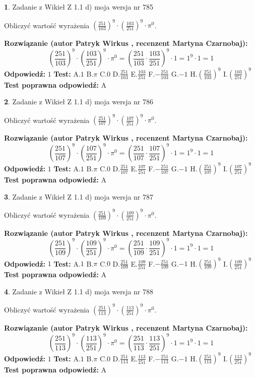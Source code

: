 \documentclass[12pt, a4paper]{article}
\theoremstyle{definition} %
\newtheorem{zad}{}
\newcommand{\zadStart}[1]{\begin{zad}#1\newline}
\newcommand{\zadStop}{\end{zad}}
\newcommand{\rozwStart}[2]{\noindent \textbf{Rozwiązanie (autor #1 , recenzent #2): }\newline}
\newcommand{\rozwStop}{\newline}
\newcommand{\odpStart}{\noindent \textbf{Odpowiedź:}\newline}
\newcommand{\odpStop}{\newline}
\newcommand{\testStart}{\noindent \textbf{Test:}\newline}
\newcommand{\testStop}{\newline}
\newcommand{\kluczStart}{\noindent \textbf{Test poprawna odpowiedź:}\newline}
\newcommand{\kluczStop}{\newline}
\begin{document}
\zadStart{Zadanie z Wikieł Z 1.1 d) moja wersja nr 785}

Obliczyć wartość wyrażenia $(\frac{251}{103})^{9} \cdot (\frac{103}{251})^{9} \cdot \pi^{0}$.
\zadStop
\rozwStart{Patryk Wirkus}{Martyna Czarnobaj}
$$(\frac{251}{103})^{9} \cdot (\frac{103}{251})^{9} \cdot \pi^{0} = (\frac{251}{103} \cdot \frac{103}{251})^{9} \cdot 1 = 1^{9} \cdot 1 = 1$$
\rozwStop
\odpStart
$1$
\odpStop
\testStart
A.$1$ B.$\pi$ C.$0$ D.$\frac{251}{103}$ E.$\frac{103}{251}$
F.$-\frac{251}{103}$ G.$-1$
H.$(\frac{251}{103})^{9}$
I.$(\frac{103}{251})^{9}$
\testStop
\kluczStart
A
\kluczStop



\zadStart{Zadanie z Wikieł Z 1.1 d) moja wersja nr 786}

Obliczyć wartość wyrażenia $(\frac{251}{107})^{9} \cdot (\frac{107}{251})^{9} \cdot \pi^{0}$.
\zadStop
\rozwStart{Patryk Wirkus}{Martyna Czarnobaj}
$$(\frac{251}{107})^{9} \cdot (\frac{107}{251})^{9} \cdot \pi^{0} = (\frac{251}{107} \cdot \frac{107}{251})^{9} \cdot 1 = 1^{9} \cdot 1 = 1$$
\rozwStop
\odpStart
$1$
\odpStop
\testStart
A.$1$ B.$\pi$ C.$0$ D.$\frac{251}{107}$ E.$\frac{107}{251}$
F.$-\frac{251}{107}$ G.$-1$
H.$(\frac{251}{107})^{9}$
I.$(\frac{107}{251})^{9}$
\testStop
\kluczStart
A
\kluczStop



\zadStart{Zadanie z Wikieł Z 1.1 d) moja wersja nr 787}

Obliczyć wartość wyrażenia $(\frac{251}{109})^{9} \cdot (\frac{109}{251})^{9} \cdot \pi^{0}$.
\zadStop
\rozwStart{Patryk Wirkus}{Martyna Czarnobaj}
$$(\frac{251}{109})^{9} \cdot (\frac{109}{251})^{9} \cdot \pi^{0} = (\frac{251}{109} \cdot \frac{109}{251})^{9} \cdot 1 = 1^{9} \cdot 1 = 1$$
\rozwStop
\odpStart
$1$
\odpStop
\testStart
A.$1$ B.$\pi$ C.$0$ D.$\frac{251}{109}$ E.$\frac{109}{251}$
F.$-\frac{251}{109}$ G.$-1$
H.$(\frac{251}{109})^{9}$
I.$(\frac{109}{251})^{9}$
\testStop
\kluczStart
A
\kluczStop



\zadStart{Zadanie z Wikieł Z 1.1 d) moja wersja nr 788}

Obliczyć wartość wyrażenia $(\frac{251}{113})^{9} \cdot (\frac{113}{251})^{9} \cdot \pi^{0}$.
\zadStop
\rozwStart{Patryk Wirkus}{Martyna Czarnobaj}
$$(\frac{251}{113})^{9} \cdot (\frac{113}{251})^{9} \cdot \pi^{0} = (\frac{251}{113} \cdot \frac{113}{251})^{9} \cdot 1 = 1^{9} \cdot 1 = 1$$
\rozwStop
\odpStart
$1$
\odpStop
\testStart
A.$1$ B.$\pi$ C.$0$ D.$\frac{251}{113}$ E.$\frac{113}{251}$
F.$-\frac{251}{113}$ G.$-1$
H.$(\frac{251}{113})^{9}$
I.$(\frac{113}{251})^{9}$
\testStop
\kluczStart
A
\kluczStop
\end{document}

